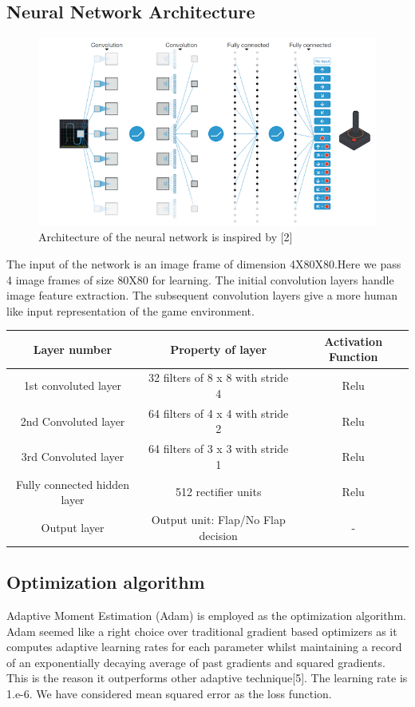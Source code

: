 \documentclass{article}
\begin{document}
\subsection{Neural Network Architecture}

\begin{figure}[H]
  \centering
      \includegraphics{expt2}
  \caption{Architecture of the neural network is inspired by [2]}
\end{figure}

The input of the network is an image frame of dimension 4X80X80.Here we pass 4 image frames of size 80X80 for learning. The initial convolution layers handle image feature extraction. The subsequent convolution layers give a more human like input representation of the game environment.

\begin{center}
 \begin{tabular}{||c c c||} 
 \hline
 Layer number & Property of layer & Activation Function \\ [0.5ex] 
 \hline\hline
 1st convoluted layer & 32 filters of 8 x 8 with stride 4 & Relu \\ 
 \hline
 2nd Convoluted layer & 64 filters of 4 x 4 with stride 2 & Relu \\
 \hline
 3rd Convoluted layer & 64 filters of 3 x 3 with stride 1 & Relu \\
 \hline
 Fully connected hidden layer & 512 rectifier units & Relu \\
 \hline
 Output layer & Output unit: Flap/No Flap decision & - \\ [1ex] 
 \hline
\end{tabular}
\end{center}

\subsection{Optimization algorithm}
Adaptive Moment Estimation (Adam) is employed as the optimization algorithm. Adam seemed like a right choice over traditional gradient based optimizers as it computes adaptive learning rates for each parameter whilst maintaining a record of  an exponentially decaying average of past gradients and squared gradients. This is the reason it outperforms  other adaptive technique[5]. The learning rate is 1.e-6. We have considered mean squared error as the loss function.
\end{document}
